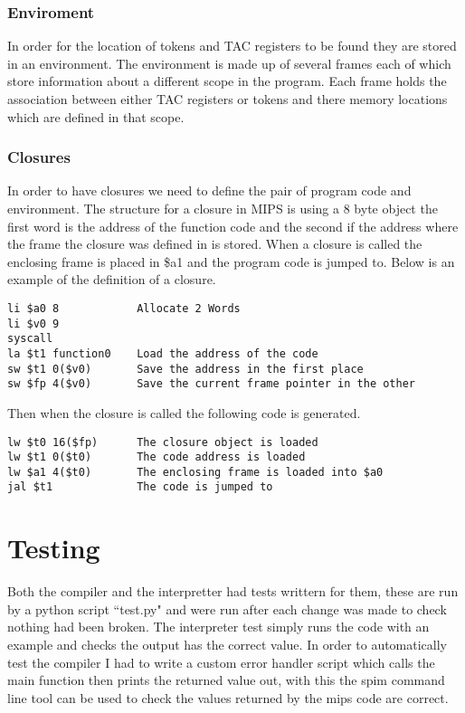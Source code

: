 \documentclass{article}
\begin{document}
\subsubsection{Enviroment}
In order for the location of tokens and TAC registers to be found they are stored
in an environment. The environment is made up of several frames each of which store
information about a different scope in the program. Each frame holds the association
between either TAC registers or tokens and there memory locations which are defined
in that scope.

\subsubsection{Closures}

In order to have closures we need to define the pair of program code and environment.
The structure for a closure in MIPS is using a 8 byte object the first word is
the address of the function code and the second if the address where the frame
the closure was defined in is stored. When a closure is called the enclosing frame is
placed in \$a1 and the program code is jumped to. Below is an example of the definition
of a closure.

\begin{lstlisting}
li $a0 8            Allocate 2 Words
li $v0 9
syscall
la $t1 function0    Load the address of the code
sw $t1 0($v0)       Save the address in the first place
sw $fp 4($v0)       Save the current frame pointer in the other
\end{lstlisting}

Then when the closure is called the following code is generated.

\begin{lstlisting}
lw $t0 16($fp)      The closure object is loaded
lw $t1 0($t0)       The code address is loaded
lw $a1 4($t0)       The enclosing frame is loaded into $a0
jal $t1             The code is jumped to
\end{lstlisting}

\section{Testing}

Both the compiler and the interpretter had tests writtern for them, these are run
by a python script ``test.py" and were run after each change was made to check
nothing had been broken. The interpreter test simply runs the code with an example
and checks the output has the correct value. In order to automatically test the
compiler I had to write a custom error handler script which calls the main function
then prints the returned value out, with this the spim command line tool can be used
to check the values returned by the mips code are correct.
\end{document}
